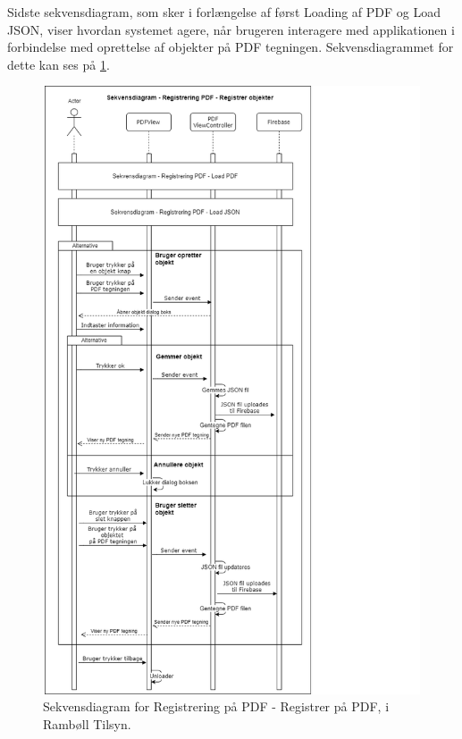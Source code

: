 Sidste sekvensdiagram, som sker i forlængelse af først Loading af PDF og Load JSON, viser hvordan systemet agere, når brugeren interagere med applikationen i forbindelse med oprettelse af objekter på PDF tegningen. Sekvensdiagrammet for dette kan ses på \ref{fig:RegistrerObjekterSekvensDiagram}.
\begin{figure}[H] %
	\centering
	\includegraphics[height=18cm, width=15cm]{Design/Applikation/RegistrePDF/RegistrerObjekterSekvensDiagram}
	\caption{Sekvensdiagram for Registrering på PDF - Registrer på PDF, i Rambøll Tilsyn.}
	\label{fig:RegistrerObjekterSekvensDiagram}
\end{figure}

\clearpage

